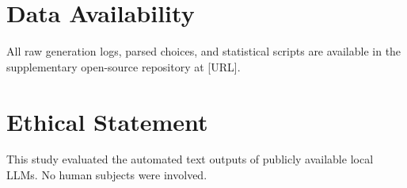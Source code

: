 \documentclass[10pt,journal,compsoc]{IEEEtran}
\begin{document}
\section*{Data Availability}
All raw generation logs, parsed choices, and statistical scripts are available in the supplementary open-source repository at [URL]. 

\section*{Ethical Statement}
This study evaluated the automated text outputs of publicly available local LLMs. No human subjects were involved. 



\end{document}
